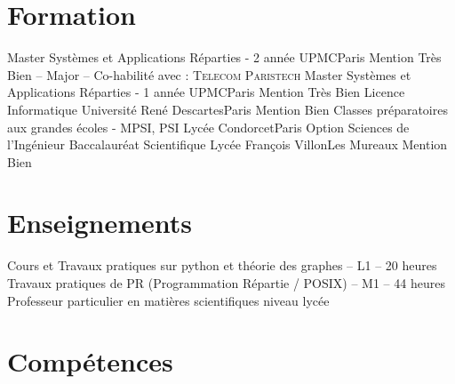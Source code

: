 \documentclass[11pt,a4paper,sans]{moderncv}
\begin{document}
\section{Formation}
\vspace{1em}

        {Master Systèmes et Applications Réparties - 2 année}
        {UPMC}{Paris}{}
        {Mention Très Bien -- Major -- Co-habilité avec : \textsc{Telecom Paristech}}
        {Master Systèmes et Applications Réparties - 1 année}
        {UPMC}{Paris}{}
        {Mention Très Bien}
        {Licence Informatique}
        {Université René Descartes}{Paris}{}
        {Mention Bien}
        {Classes préparatoires aux grandes écoles - MPSI, PSI\up{*}}
        {Lycée Condorcet}{Paris}{}
        {Option Sciences de l'Ingénieur}
        {Baccalauréat Scientifique}
        {Lycée François Villon}{Les Mureaux}{}
        {Mention Bien}

\vspace{2em}


\section{Enseignements}
\vspace{1em}

       {Cours et Travaux pratiques sur python et théorie des graphes -- L1 -- 20 heures}
       {Travaux pratiques de PR (Programmation Répartie / POSIX) -- M1 -- 44 heures}
       {Professeur particulier en matières scientifiques niveau lycée}

\vspace{0.5em}


\section{Compétences}
\vspace{1em}
\end{document}
